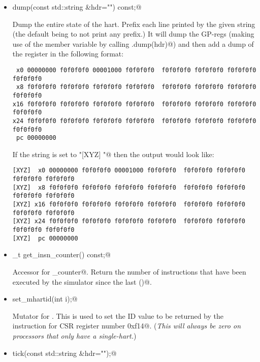 \documentclass{article}
\begin{document}
\begin{itemize}
\item \verb@void dump(const std::string &hdr="") const;@

Dump the entire state of the hart.  
Prefix each line printed by the given \verb@hdr@ string (the default being
to not print any prefix.)
It will dump the GP-regs (making use of the \verb@regs@ member variable
by calling \verb@regs.dump(hdr)@)
and then add a dump of the \verb@PC@ register in the following format:

{\small
\begin{verbatim}
 x0 00000000 f0f0f0f0 00001000 f0f0f0f0  f0f0f0f0 f0f0f0f0 f0f0f0f0 f0f0f0f0
 x8 f0f0f0f0 f0f0f0f0 f0f0f0f0 f0f0f0f0  f0f0f0f0 f0f0f0f0 f0f0f0f0 f0f0f0f0
x16 f0f0f0f0 f0f0f0f0 f0f0f0f0 f0f0f0f0  f0f0f0f0 f0f0f0f0 f0f0f0f0 f0f0f0f0
x24 f0f0f0f0 f0f0f0f0 f0f0f0f0 f0f0f0f0  f0f0f0f0 f0f0f0f0 f0f0f0f0 f0f0f0f0
 pc 00000000
\end{verbatim}
}

If the \verb@hdr@ string is set to \verb@"[XYZ] "@ then the output would look like:

{\small
\begin{verbatim}
[XYZ]  x0 00000000 f0f0f0f0 00001000 f0f0f0f0  f0f0f0f0 f0f0f0f0 f0f0f0f0 f0f0f0f0
[XYZ]  x8 f0f0f0f0 f0f0f0f0 f0f0f0f0 f0f0f0f0  f0f0f0f0 f0f0f0f0 f0f0f0f0 f0f0f0f0
[XYZ] x16 f0f0f0f0 f0f0f0f0 f0f0f0f0 f0f0f0f0  f0f0f0f0 f0f0f0f0 f0f0f0f0 f0f0f0f0
[XYZ] x24 f0f0f0f0 f0f0f0f0 f0f0f0f0 f0f0f0f0  f0f0f0f0 f0f0f0f0 f0f0f0f0 f0f0f0f0
[XYZ]  pc 00000000
\end{verbatim}
}



\item {}_t get_insn_counter() const;@

	Accessor for \verb@insn_counter@.
	Return the number of instructions that have been executed by the simulator since 
	the last \verb@reset()@.

\item \verb@void set_mhartid(int i);@

	Mutator for \verb@mhartid@.
	This is used to set the ID value to be returned by the \verb@csrrs@ instruction
	for CSR register number \verb@0xf14@.  ({\em This will always be zero on processors
	that only have a single-hart.})





\item \verb@void tick(const std::string &hdr="");@
\label{tick.specification}


\end{itemize}
\end{document}
